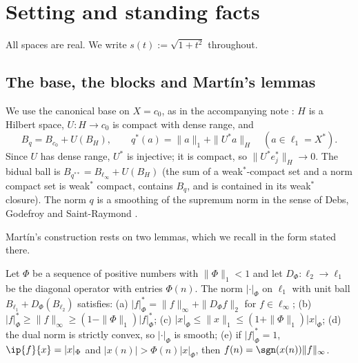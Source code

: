 \section{Setting and standing facts}\label{sec:setting}

All spaces are real.  We write $s(t):=\sqrt{1+t^2}$ throughout.

\subsection{The base, the blocks and Mart\'in's lemmas}
We use the canonical base on $X=c_0$, as in the accompanying note
\cite{PrA}: $H$ is a Hilbert space, $U:H\to c_0$ is compact with dense
range, and
\[
 B_q=B_{c_0}+U(B_H),\qquad q^*(a)=\|a\|_1+\|U^*a\|_H\quad(a\in\ell_1=X^*).
\]
Since $U$ has dense range, $U^*$ is injective; it is compact, so
$\|U^*e_j^*\|_H\to0$.  The bidual ball is $B_{q^{**}}=B_{\ell_\infty}+U(B_H)$
(the sum of a weak$^*$-compact set and a norm compact set is weak$^*$
compact, contains $B_q$, and is contained in its weak$^*$ closure).  The
norm $q$ is a smoothing of the supremum norm in the sense of
Debs, Godefroy and Saint-Raymond \cite{DGS}.

Mart\'in's construction \cite{Martin} rests on two lemmas, which we recall
in the form stated there.

\begin{remark}\label{rem:lemmaA}
Let $\Phi$ be a sequence of positive numbers with $\|\Phi\|_1<1$ and let
$D_\Phi:\ell_2\to\ell_1$ be the diagonal operator with entries $\Phi(n)$.
The norm $|\cdot|_\Phi$ on $\ell_1$ with unit ball
$B_{\ell_1}+D_\Phi(B_{\ell_2})$ satisfies:
(a) $|f|_\Phi^*=\|f\|_\infty+\|D_\Phi f\|_2$ for $f\in\ell_\infty$;
(b) $|f|^*_\Phi\geq\|f\|_\infty\geq(1-\|\Phi\|_1)|f|^*_\Phi$;
(c) $|x|_\Phi\leq\|x\|_1\leq(1+\|\Phi\|_1)|x|_\Phi$;
(d) the dual norm is strictly convex, so $|\cdot|_\Phi$ is smooth;
(e) if $|f|^*_\Phi=1$, $\ip{f}{x}=|x|_\Phi$ and $|x(n)|>\Phi(n)|x|_\Phi$,
then $f(n)=\sgn(x(n))\|f\|_\infty$.
\end{remark}

